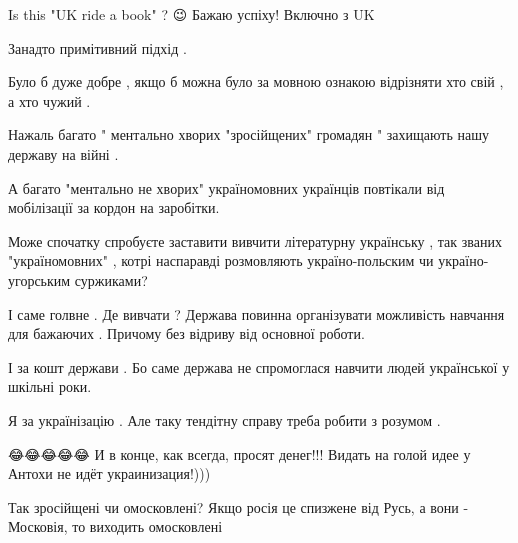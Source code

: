 \begin{itemize}
 

Is this "UK ride a book" ? 😉 Бажаю успіху! Включно з UK \Smiley[1.0][yellow]

 

Занадто примітивний підхід .

Було б дуже добре , якщо б можна було за мовною ознакою відрізняти хто свій , а
хто чужий .

Нажаль багато " ментально хворих "зросійщених" громадян " захищають нашу
державу на війні .

А багато "ментально не хворих" україномовних українців повтікали від
мобілізації за кордон на заробітки.

Може спочатку спробуєте заставити вивчити літературну українську , так званих
"україномовних" , котрі наспаравді розмовляють україно-польским чи
україно-угорським суржиками?

І саме голвне . Де вивчати ? Держава повинна організувати можливість навчання
для бажаючих . Причому без відриву від основної роботи.

І за кошт держави . Бо саме держава не спромоглася навчити людей української у
шкільні роки.

Я за українізацію . Але таку тендітну справу треба робити з розумом .

 
😂😂😂😂😂 И в конце, как всегда, просят денег!!! Видать на голой идее у Антохи не идёт украинизация!)))

 
Так зросійщені чи омосковлені? Якщо росія це спизжене від Русь, а вони - Московія, то виходить омосковлені


\end{itemize}
